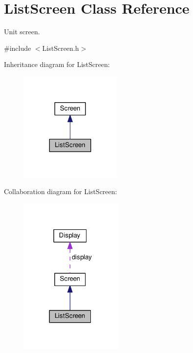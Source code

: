 \hypertarget{classListScreen}{}\section{List\+Screen Class Reference}
\label{classListScreen}


Unit screen.  




{\ttfamily \#include $<$List\+Screen.\+h$>$}



Inheritance diagram for List\+Screen\+:\nopagebreak
\begin{figure}[H]
\begin{center}
\leavevmode
\includegraphics[width=143pt]{classListScreen__inherit__graph}
\end{center}
\end{figure}


Collaboration diagram for List\+Screen\+:\nopagebreak
\begin{figure}[H]
\begin{center}
\leavevmode
\includegraphics[width=146pt]{classListScreen__coll__graph}
\end{center}
\end{figure}
